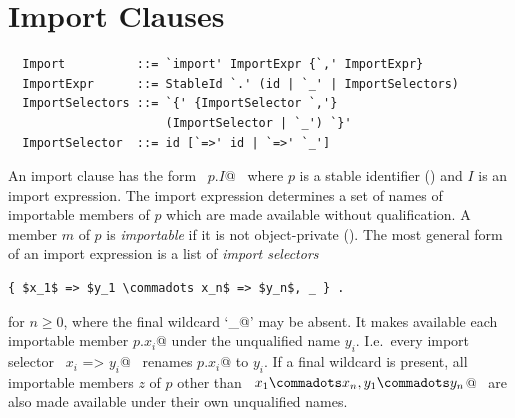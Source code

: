 
\section{Import Clauses}
\label{sec:import}

\syntax\begin{lstlisting}
  Import          ::= `import' ImportExpr {`,' ImportExpr}
  ImportExpr      ::= StableId `.' (id | `_' | ImportSelectors)
  ImportSelectors ::= `{' {ImportSelector `,'} 
                      (ImportSelector | `_') `}'
  ImportSelector  ::= id [`=>' id | `=>' `_']
\end{lstlisting}

An import clause has the form ~\lstinline@import $p$.$I$@~ where $p$ is a stable
identifier () and $I$ is an import expression.
The import expression determines a set of names of importable members of $p$
which are made available without qualification.  A member $m$ of $p$ is
{\em importable} if it is not object-private ().
The most general form of an import expression is a list of {\em import
selectors}
\begin{lstlisting}
{ $x_1$ => $y_1 \commadots x_n$ => $y_n$, _ } .
\end{lstlisting}
for $n \geq 0$, where the final wildcard `\lstinline@_@' may be absent.  It
makes available each importable member \lstinline@$p$.$x_i$@ under the unqualified name
$y_i$. I.e.\ every import selector ~\lstinline@$x_i$ => $y_i$@~ renames
\lstinline@$p$.$x_i$@ to
$y_i$.  If a final wildcard is present, all importable members $z$ of
$p$ other than ~\lstinline@$x_1 \commadots x_n,y_1 \commadots y_n$@~ are also made available
under their own unqualified names.

